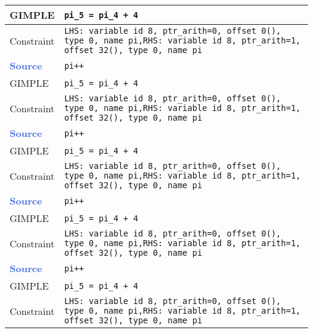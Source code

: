 \begin{center}
\begin{longtable}{| m{10ex} | m{75ex} |}
            GIMPLE & \texttt{pi\_5 = pi\_4 + 4} \\ \hline
            Constraint & \texttt{LHS: variable id 8, ptr\_arith=0, offset 0(), type 0, name pi,\newline RHS: variable id 8, ptr\_arith=1, offset 32(), type 0, name pi} \\
            \hline
            \hline
            \textcolor{RoyalBlue}{\textbf{Source}} & \texttt{pi++} \\ \hline
            GIMPLE & \texttt{pi\_5 = pi\_4 + 4} \\ \hline
            Constraint & \texttt{LHS: variable id 8, ptr\_arith=0, offset 0(), type 0, name pi,\newline RHS: variable id 8, ptr\_arith=1, offset 32(), type 0, name pi} \\
            \hline
            \hline
            \textcolor{RoyalBlue}{\textbf{Source}} & \texttt{pi++} \\ \hline
            GIMPLE & \texttt{pi\_5 = pi\_4 + 4} \\ \hline
            Constraint & \texttt{LHS: variable id 8, ptr\_arith=0, offset 0(), type 0, name pi,\newline RHS: variable id 8, ptr\_arith=1, offset 32(), type 0, name pi} \\
            \hline
            \hline
            \textcolor{RoyalBlue}{\textbf{Source}} & \texttt{pi++} \\ \hline
            GIMPLE & \texttt{pi\_5 = pi\_4 + 4} \\ \hline
            Constraint & \texttt{LHS: variable id 8, ptr\_arith=0, offset 0(), type 0, name pi,\newline RHS: variable id 8, ptr\_arith=1, offset 32(), type 0, name pi} \\
            \hline
            \hline
            \textcolor{RoyalBlue}{\textbf{Source}} & \texttt{pi++} \\ \hline
            GIMPLE & \texttt{pi\_5 = pi\_4 + 4} \\ \hline
            Constraint & \texttt{LHS: variable id 8, ptr\_arith=0, offset 0(), type 0, name pi,\newline RHS: variable id 8, ptr\_arith=1, offset 32(), type 0, name pi} \\
            \hline
        \end{longtable}
    \end{center}


